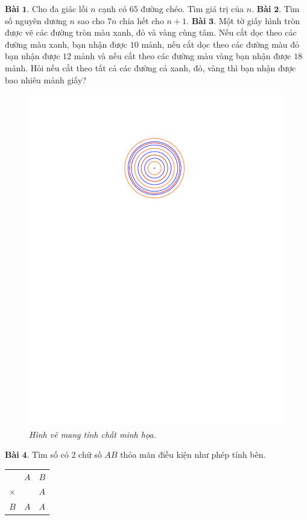 \begin{multicols}{2}
	\textbf{\color{toancuabi}Bài} $\pmb{1.}$ Cho đa giác lồi $n$ cạnh có $65$ đường chéo. Tìm giá trị của $n$.
	\vskip 0.1cm
	\textbf{\color{toancuabi}Bài} $\pmb{2.}$ Tìm số nguyên dương $n$ sao cho $7n$ chia hết cho $n+1$.
	\vskip 0.1cm
	\textbf{\color{toancuabi}Bài} $\pmb{3.}$ Một tờ giấy hình tròn được vẽ các đường tròn màu xanh, đỏ và vàng cùng tâm. Nếu cắt dọc theo các đường màu xanh, bạn nhận được $10$ mảnh, nếu cắt dọc theo các đường màu đỏ bạn nhận được $12$ mảnh và nếu cắt theo các đường màu vàng bạn nhận được $18$ mảnh. Hỏi nếu cắt theo tất cả các đường cả xanh, đỏ, vàng thì bạn nhận được bao nhiêu mảnh giấy?
	\vskip 0.1cm
	\begin{figure}[H]
		\vspace*{-5pt}
		\centering
		\captionsetup{labelformat= empty, justification=centering}
		\includegraphics[width= 0.6\linewidth]{bai3}
		\caption{\small\textit{\color{toancuabi}Hình vẽ mang tính chất minh họa.}}
		\vspace*{-10pt}
	\end{figure}
	\textbf{\color{toancuabi}Bài} $\pmb{4.}$ Tìm số có $2$ chữ số $AB$ thỏa mãn điều kiện như
	phép tính bên.
	\begin{table}[H]
		\vspace*{-5pt}
		\centering
		\captionsetup{labelformat= empty, justification=centering}
		\begin{tabular}{ccc}
			&$A$&$B$\\
			$\times$& &$A$\\
			\hline
			$B$&$A$&$A$\\

\end{tabular}
\end{table}
\end{multicols}

